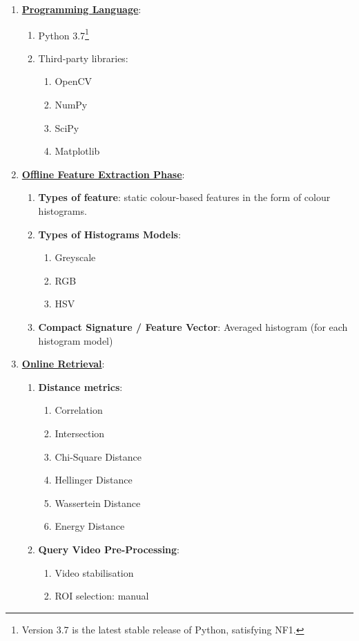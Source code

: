 \begin{enumerate}
    \item \underline{\textbf{Programming Language}}: 
    \begin{enumerate}
        \item Python 3.7\footnote{Version 3.7 is the latest stable release of Python, satisfying NF1.}
        \item Third-party libraries:
        \begin{enumerate}
            \item OpenCV
            \item NumPy
            \item SciPy
            \item Matplotlib
        \end{enumerate}
    \end{enumerate}
    
    \item \underline{\textbf{Offline Feature Extraction Phase}}:
    \begin{enumerate}
        \item \textbf{Types of feature}: static colour-based features in the form of colour histograms.
        \item \textbf{Types of Histograms Models}:
        \begin{enumerate}
            \item Greyscale
            \item RGB
            \item HSV
        \end{enumerate}
        \item \textbf{Compact Signature / Feature Vector}: Averaged histogram (for each histogram model)
    \end{enumerate}
    
    \item \underline{\textbf{Online Retrieval}}: 
    \begin{enumerate}
        \item \textbf{Distance metrics}:
            \begin{enumerate}
                \item Correlation
                \item Intersection
                \item Chi-Square Distance
                \item Hellinger Distance
                \item Wassertein Distance
                \item Energy Distance
            \end{enumerate}
        \item \textbf{Query Video Pre-Processing}:
        \begin{enumerate}
            \item Video stabilisation
            \item ROI selection: manual
        \end{enumerate}
    \end{enumerate}
    

\end{enumerate}
